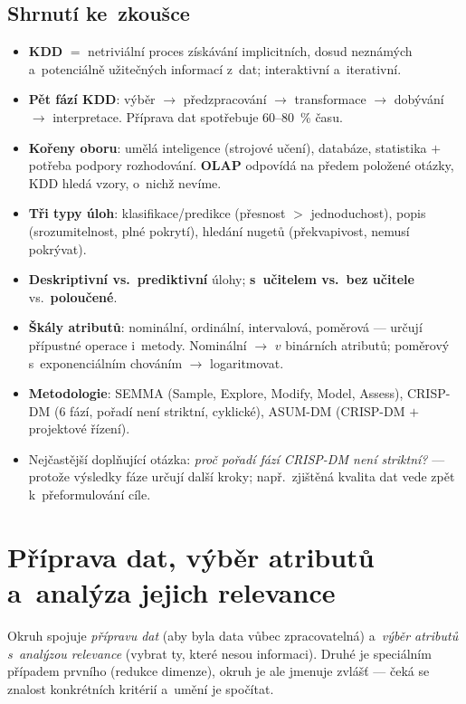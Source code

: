 \documentclass[11pt,a4paper]{article}
\theoremstyle{definition}
\begin{document}
\subsection{Shrnutí ke~zkoušce}

\begin{itemize}
\item \textbf{KDD} $=$ netriviální proces získávání implicitních, dosud neznámých
      a~potenciálně užitečných informací z~dat; interaktivní a~iterativní.
\item \textbf{Pět fází KDD}: výběr $\to$ předzpracování $\to$ transformace $\to$ dobývání
      $\to$ interpretace. Příprava dat spotřebuje 60--80~\% času.
\item \textbf{Kořeny oboru}: umělá inteligence (strojové učení), databáze, statistika
      $+$ potřeba podpory rozhodování. \textbf{OLAP} odpovídá na předem položené otázky,
      KDD hledá vzory, o~nichž nevíme.
\item \textbf{Tři typy úloh}: klasifikace/predikce (přesnost $>$ jednoduchost), popis
      (srozumitelnost, plné pokrytí), hledání nugetů (překvapivost, nemusí pokrývat).
\item \textbf{Deskriptivní vs.\ prediktivní} úlohy; \textbf{s~učitelem vs.\ bez učitele}
      vs.\ \textbf{poloučené}.
\item \textbf{Škály atributů}: nominální, ordinální, intervalová, poměrová --- určují
      přípustné operace i~metody. Nominální $\to$ $v$ binárních atributů; poměrový
      s~exponenciálním chováním $\to$ logaritmovat.
\item \textbf{Metodologie}: SEMMA (Sample, Explore, Modify, Model, Assess), CRISP-DM
      (6 fází, pořadí není striktní, cyklické), ASUM-DM (CRISP-DM $+$ projektové řízení).
\item Nejčastější doplňující otázka: \emph{proč pořadí fází CRISP-DM není striktní?} ---
      protože výsledky fáze určují další kroky; např.\ zjištěná kvalita dat vede zpět
      k~přeformulování cíle.
\end{itemize}

\newpage
\section{Příprava dat, výběr atributů a~analýza jejich relevance}
\label{sec:priprava}

Okruh spojuje \emph{přípravu dat} (aby byla data vůbec zpracovatelná) a~\emph{výběr atributů
s~analýzou relevance} (vybrat ty, které nesou informaci). Druhé je speciálním případem
prvního (redukce dimenze), okruh je ale jmenuje zvlášť --- čeká se znalost konkrétních
kritérií a~umění je spočítat.
\end{document}

